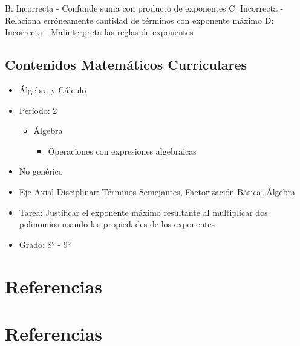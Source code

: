 \documentclass[
]{article}
\providecommand{\tightlist}{%
  \setlength{\itemsep}{0pt}\setlength{\parskip}{0pt}}
\newlength{\cslhangindent}
\newenvironment{CSLReferences}[2] %
 {\begin{list}{}{%
  \setlength{\itemindent}{0pt}
  \setlength{\leftmargin}{0pt}
  \setlength{\parsep}{0pt}
  \ifodd #1
   \setlength{\leftmargin}{\cslhangindent}
   \setlength{\itemindent}{-1\cslhangindent}
  \fi
  \setlength{\itemsep}{#2\baselineskip}}}
 {\end{list}}
\begin{document}
B: Incorrecta - Confunde suma con producto de exponentes C: Incorrecta -
Relaciona erróneamente cantidad de términos con exponente máximo D:
Incorrecta - Malinterpreta las reglas de exponentes

\subsection{Contenidos Matemáticos
Curriculares}\label{contenidos-matemuxe1ticos-curriculares-7}

\begin{itemize}
\tightlist
\item
  Álgebra y Cálculo
\item
  Período: 2

  \begin{itemize}
  \tightlist
  \item
    Álgebra

    \begin{itemize}
    \tightlist
    \item
      Operaciones con expresiones algebraicas
    \end{itemize}
  \end{itemize}
\item
  No genérico
\item
  Eje Axial Disciplinar: Términos Semejantes, Factorización Básica:
  Álgebra
\item
  Tarea: Justificar el exponente máximo resultante al multiplicar dos
  polinomios usando las propiedades de los exponentes
\item
  Grado: 8° - 9°
\end{itemize}

\section{Referencias}\label{referencias}

\section{Referencias}\label{referencias-1}

\label{refs}
\begin{CSLReferences}{0}{1}
\end{CSLReferences}
\end{document}
